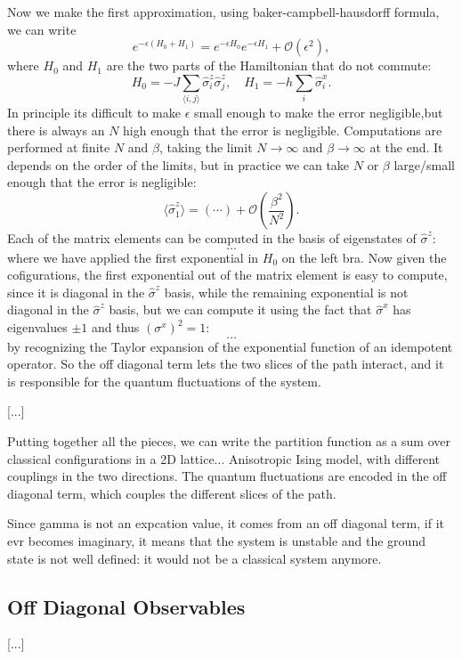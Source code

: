 Now we make the first approximation, using baker-campbell-hausdorff formula, we can write
\[
    e^{-\epsilon (H_0 + H_1)} = e^{-\epsilon H_0} e^{-\epsilon H_1} + \mathcal{O}(\epsilon^2),
\]
where $H_0$ and $H_1$ are the two parts of the Hamiltonian that do not commute:
\[
    H_0 = -J \sum_{\langle i,j \rangle} \hat{\sigma}_i^z \hat{\sigma}_j^z, \quad H_1 = -h \sum_i \hat{\sigma}_i^x.
\]
In principle its difficult to make \(\epsilon\) small enough to make the error negligible,but there is always an \(N\) high enough that the error is negligible. Computations are performed at finite \(N\) and \(\beta\), taking the limit \(N \to \infty\) and \(\beta \to \infty\) at the end. It depends on the order of the limits, but in practice we can take \(N\) or \(\beta\) large/small enough that the error is negligible:
\[
    \langle \hat{\sigma}_1^z \rangle = (\cdots) + \mathcal{O}\left(\frac{\beta^2}{N^2}\right).
\]
Each of the matrix elements can be computed in the basis of eigenstates of \(\hat{\sigma}^z\):
\[
    \dots
\]
where we have applied the first exponential in \(H_0\) on the left bra. Now given the cofigurations, the first exponential out of the matrix element is easy to compute, since it is diagonal in the \(\hat{\sigma}^z\) basis, while the remaining exponential is not diagonal in the \(\hat{\sigma}^z\) basis, but we can compute it using the fact that \(\hat{\sigma}^x\) has eigenvalues \(\pm 1\) and thus \((\sigma^x)^2 = 1\):
\[
    \dots
\]
by recognizing the Taylor expansion of the exponential function of an idempotent operator. So the off diagonal term lets the two slices of the path interact, and it is responsible for the quantum fluctuations of the system.

    [...]

Putting together all the pieces, we can write the partition function as a sum over classical configurations in a 2D lattice... Anisotropic Ising model, with different couplings in the two directions. The quantum fluctuations are encoded in the off diagonal term, which couples the different slices of the path.

Since gamma is not an expcation value, it comes from an off diagonal term, if it evr becomes imaginary, it means that the system is unstable and the ground state is not well defined: it would not be a classical system anymore.

\subsection{Off Diagonal Observables}

[...]

